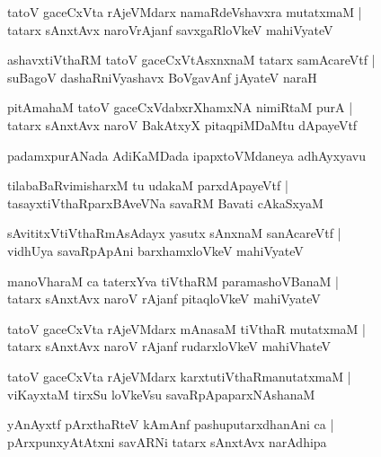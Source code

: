 \documentclass[twoside,12pt,openright]{book}
\newcounter{shloka}[chapter]
\begin{document}
\begin{shloka}
tatoV gaceCxVta rAjeVMdarx namaRdeVshavxra mutatxmaM |\\
tatarx sAnxtAvx naroVrAjanf savxgaRloVkeV mahiVyateV 
\end{shloka}

\begin{shloka}
ashavxtiVthaRM tatoV gaceCxVtAsxnxnaM tatarx samAcareVtf |\\
suBagoV dashaRniVyashavx BoVgavAnf jAyateV naraH
\end{shloka}

\begin{shloka}
pitAmahaM tatoV gaceCxVdabxrXhamxNA nimiRtaM purA |\\
tatarx sAnxtAvx naroV BakAtxyX pitaqpiMDaMtu dApayeVtf
\end{shloka}

\begin{center}
padamxpurANada AdiKaMDada ipapxtoVMdaneya adhAyxyavu
\end{center}


\begin{shloka}
tilabaBaRvimisharxM tu udakaM parxdApayeVtf |\\
tasayxtiVthaRparxBAveVNa savaRM Bavati cAkaSxyaM
\end{shloka}

\begin{shloka}
sAvititxVtiVthaRmAsAdayx yasutx sAnxnaM sanAcareVtf |\\
vidhUya savaRpApAni barxhamxloVkeV mahiVyateV
\end{shloka}

\begin{shloka}
manoVharaM ca taterxYva tiVthaRM paramashoVBanaM |\\
tatarx sAnxtAvx naroV rAjanf pitaqloVkeV mahiVyateV
\end{shloka}

\begin{shloka}
tatoV gaceCxVta rAjeVMdarx mAnasaM tiVthaR mutatxmaM  |\\
tatarx sAnxtAvx naroV rAjanf rudarxloVkeV mahiVhateV
\end{shloka}

\begin{shloka}
tatoV gaceCxVta rAjeVMdarx karxtutiVthaRmanutatxmaM |\\
viKayxtaM tirxSu loVkeVsu savaRpApaparxNAshanaM
\end{shloka}

\begin{shloka}
yAnAyxtf pArxthaRteV kAmAnf pashuputarxdhanAni ca |\\
pArxpunxyAtAtxni savARNi tatarx sAnxtAvx narAdhipa
\end{shloka}
\end{document}
